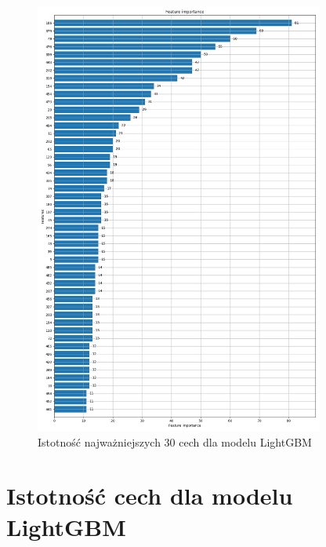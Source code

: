 \documentclass[a4paper,12pt]{article}
\begin{document}
\begin{appendices}
        \begin{figure}[!h]
            \centering
            \includegraphics[width=0.85\textwidth]{../images/lightgbm-feature-importance.png}
            \caption{Istotność najważniejszych 30 cech dla modelu LightGBM}
            \label{fig:feature-importance-lightgbm}
        \end{figure}

        \section{Istotność cech dla modelu LightGBM}\label{appendix:feature-importance-xgboost}


\end{appendices}
\end{document}
